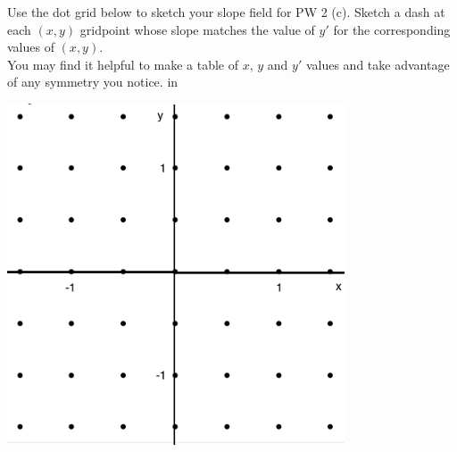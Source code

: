 \documentclass[epsf]{article}
\begin{document}
\newpage


Use the dot grid below to sketch your slope field for PW 2 (c).  Sketch a dash at each $(x,y)$ gridpoint whose slope matches the value of $y'$ for the corresponding values of $(x,y)$. \\

You may find it helpful to make a table of $x$, $y$ and $y'$ values and take advantage of any symmetry you notice.
 in
\begin{center}
\includegraphics[width=100mm]{dotgrid.png}
\end{center}
\end{document}
